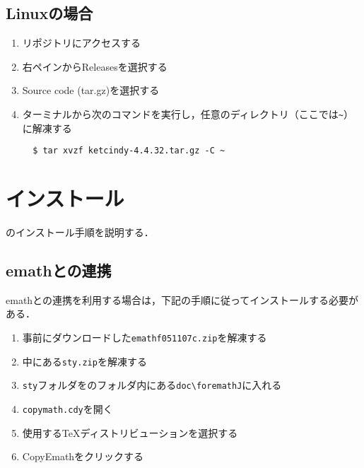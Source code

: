 \newpage

\subsection{Linuxの場合}
\begin{enumerate}
    \item リポジトリにアクセスする
    \item 右ペインからReleasesを選択する
    \item Source code (tar.gz)を選択する
    \item ターミナルから次のコマンドを実行し，任意のディレクトリ（ここでは\verb|~|）に解凍する
    \begin{lstlisting}
  $ tar xvzf ketcindy-4.4.32.tar.gz -C ~
    \end{lstlisting}
\end{enumerate}

\section{インストール}

{\ketcindy}のインストール手順を説明する．

\subsection{emathとの連携}
emathとの連携を利用する場合は，下記の手順に従ってインストールする必要がある．
\begin{enumerate}
    \item 事前にダウンロードした\verb|emathf051107c.zip|を解凍する
    \item 中にある\verb|sty.zip|を解凍する
    \item \verb|sty|フォルダを{\ketcindy}のフォルダ内にある\verb|doc\foremathJ|に入れる
    \item \verb|copymath.cdy|を開く
    \item 使用する{\TeX}ディストリビューションを選択する
    \item CopyEmathをクリックする
\end{enumerate}

